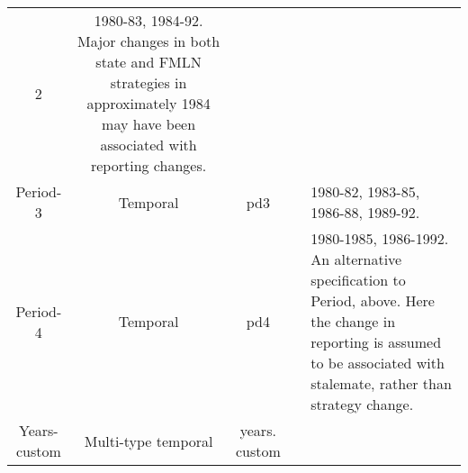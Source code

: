 \documentclass[11pt,]{article}
\begin{document}
\begin{longtable}[]{@{}ccccl@{}}
\begin{minipage}[t]{0.09\columnwidth}
2\strut
\end{minipage} & \begin{minipage}[t]{0.38\columnwidth}\raggedright
1980-83, 1984-92. Major changes in both state and FMLN strategies in
approximately 1984 may have been associated with reporting
changes.\strut
\end{minipage}\tabularnewline
\begin{minipage}[t]{0.17\columnwidth}\centering
Period-3\strut
\end{minipage} & \begin{minipage}[t]{0.14\columnwidth}\centering
Temporal\strut
\end{minipage} & \begin{minipage}[t]{0.08\columnwidth}\centering
pd3\strut
\end{minipage} & \begin{minipage}[t]{0.09\columnwidth}\centering
4\strut
\end{minipage} & \begin{minipage}[t]{0.38\columnwidth}\raggedright
1980-82, 1983-85, 1986-88, 1989-92.\strut
\end{minipage}\tabularnewline
\begin{minipage}[t]{0.17\columnwidth}\centering
Period-4\strut
\end{minipage} & \begin{minipage}[t]{0.14\columnwidth}\centering
Temporal\strut
\end{minipage} & \begin{minipage}[t]{0.08\columnwidth}\centering
pd4\strut
\end{minipage} & \begin{minipage}[t]{0.09\columnwidth}\centering
2\strut
\end{minipage} & \begin{minipage}[t]{0.38\columnwidth}\raggedright
1980-1985, 1986-1992. An alternative specification to Period, above.
Here the change in reporting is assumed to be associated with stalemate,
rather than strategy change.\strut
\end{minipage}\tabularnewline
\begin{minipage}[t]{0.17\columnwidth}\centering
Years-custom\strut
\end{minipage} & \begin{minipage}[t]{0.14\columnwidth}\centering
Multi-type temporal\strut
\end{minipage} & \begin{minipage}[t]{0.08\columnwidth}\centering
years. custom\strut

\end{minipage}
\end{longtable}
\end{document}
